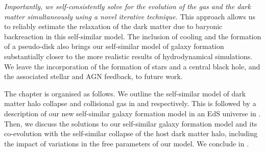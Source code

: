 \emph{Importantly, we self-consistently solve for the evolution of the gas and the dark matter simultaneously using a novel iterative technique.} This approach allows us to reliably estimate the relaxation of the dark matter due to baryonic backreaction in this self-similar model. The inclusion of cooling and the formation of a pseudo-disk also brings our self-similar model of galaxy formation substantially closer to the more realistic results of hydrodynamical simulations. We leave the incorporation of the formation of stars and a central black hole, and the associated stellar and AGN feedback, to future work.

The chapter is organised as follows. We outline the self-similar model of dark matter halo collapse and collisional gas in  and  respectively. This is followed by a description of our new self-similar galaxy formation model in an EdS universe in \secref{}. Then, we discuss the solutions to our self-similar galaxy formation model and its co-evolution with the self-similar collapse of the host dark matter halo, including the impact of variations in the free parameters of our model. We conclude in .













